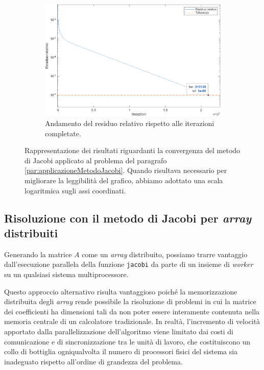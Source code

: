 \begin{figure}[!htbp]
        \vspace{1.5em}

        \begin{subfigure}{0.58\textwidth}
            \centering
            \includegraphics[width=\linewidth]{../Risorse/Capitolo 3/evoluzioneResiduoRelativo.png}
            \caption{Andamento del residuo relativo rispetto alle iterazioni completate.}
            \label{fig:evoluzioneResiduoRelativo}
        \end{subfigure}

        \caption{Rappresentazione dei risultati riguardanti la convergenza del metodo di Jacobi applicato al problema del paragrafo \ref{par:applicazioneMetodoJacobi}. Quando risultava necessario per migliorare la leggibilit\`a del grafico, abbiamo adottato una scala logaritmica sugli assi coordinati.}
        \label{fig:gruppoImmaginiAnalisiPrestazionale}
    \end{figure}
    \subsection{Risoluzione con il metodo di Jacobi per \textit{array} distribuiti}
    Generando la matrice $A$ come un \textit{array} distribuito, possiamo trarre vantaggio dall'esecuzione parallela della funzione \lstinline{jacobi} da parte
di un insieme di \textit{worker} su un qualsiasi sistema multiprocessore.

Questo approccio alternativo risulta vantaggioso poich\'e la memorizzazione distribuita degli \textit{array} rende possibile la risoluzione di problemi in cui la matrice dei coefficienti ha dimensioni
tali da non poter essere interamente contenuta nella memoria centrale di un calcolatore tradizionale.\newline
In realt\`a, l'incremento di velocit\`a apportato dalla parallelizzazione dell'algoritmo viene limitato dai costi di comunicazione e di sincronizzazione tra le unit\`a di lavoro, che costituiscono un collo di bottiglia ogniqualvolta il numero di processori fisici del sistema sia inadeguato rispetto all'ordine di grandezza del problema.

